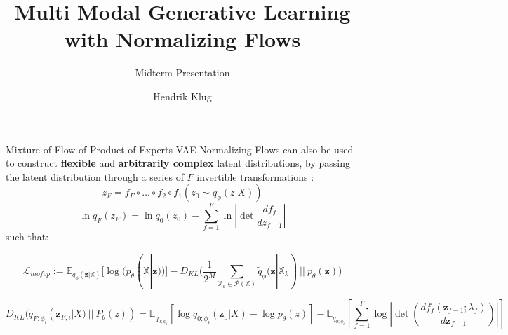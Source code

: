 

\title[Multi Modal Generative Learning with Normalizing Flows]{Multi Modal Generative Learning with Normalizing Flows}
\subtitle{Midterm Presentation}
\author[Hendrik Klug]{Hendrik Klug}




    

    

    

    \begin{frame}{Mixture of Flow of Product of Experts VAE}
        Normalizing Flows can also be used to construct \textbf{flexible} and \textbf{arbitrarily complex} latent distributions, by passing the latent distribution through a series of $F$ invertible transformations \citep{rezende_variational_2016, berg_sylvester_2019}:
        \begin{equation*}
            z_F = f_F \circ \ldots \circ f_2 \circ f_1(z_0 \sim q_{\phi}(z|X))
        \end{equation*}
        \begin{equation*}
            \ln q_F(z_F) = \ln q_0 (z_0) - \sum _{f=1} ^{F}\ln \left|  \det \frac{df_f}{dz_{f-1}}\right|
        \end{equation*}
        such that:
        \begin{small}

            \begin{equation*}
                \mathcal{L}_{mofop} := \mathbb{E}_{q_{\phi}(\textbf{z}|\mathbb{X})}[\log (p_{\theta}(\mathbb{X}|\textbf{z}))] - D_{KL}\biggl( \frac{1}{2^M} \sum _{\mathbb{X}_k \in \mathcal{P}(\mathbb{X})} \tilde{q}_{\phi}(\textbf{z}|\mathbb{X}_k)\ ||\ p_{\theta}(\textbf{z})\biggr)
            \end{equation*}

            \begin{equation*}
                D_{KL}(\tilde{q}_{F; \phi_i}(\textbf{z}_{F,i}|X)\ ||\ P_{\theta}(z)) =
                \mathbb{E}_{\tilde{q}_{0; \phi_i}} \left[ \log \tilde{q}_{0; \phi_i}(\textbf{z}_0|X) -\log p_{\theta}(z) \right] - \mathbb{E}_{\tilde{q}_{0; \phi_i}}\left[ \sum_{f=1}^{F} \log \left| \det \left( \frac{d f_f (\textbf{z}_{f-1}; \lambda_f)}{d\textbf{z}_{f-1}} \right) \right| \right]
            \end{equation*}
        \end{small}

    \end{frame}

